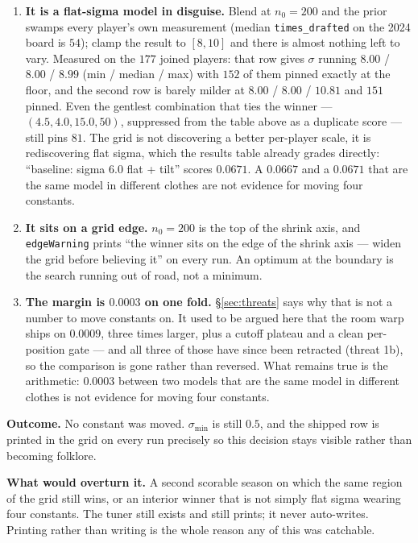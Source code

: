 \documentclass[10pt,a4paper]{article}
\theoremstyle{plain}
\theoremstyle{definition}
\theoremstyle{remark}
\newcommand{\code}[1]{\texttt{\small #1}}
\begin{document}
\begin{enumerate}
\item \textbf{It is a flat-sigma model in disguise.} Blend at $n_0 = 200$ and the prior
swamps every player's own measurement (median \code{times\_drafted} on the 2024 board is
$54$); clamp the result to $[8, 10]$ and there is almost nothing left to vary. Measured on
the $177$ joined players: that row gives $\sigma$ running $8.00$ / $8.00$ / $8.99$ (min /
median / max) with $152$ of them pinned exactly at the floor, and the second row is barely
milder at $8.00$ / $8.00$ / $10.81$ and $151$ pinned. Even the gentlest combination that
ties the winner --- $(4.5, 4.0, 15.0, 50)$, suppressed from the table above as a duplicate
score --- still pins $81$. The grid is not discovering a better per-player scale, it is
rediscovering flat sigma, which the results table already grades directly: ``baseline:
sigma 6.0 flat + tilt'' scores $0.0671$. A $0.0667$ and a $0.0671$ that are the same
model in different clothes are not evidence for moving four constants.

\item \textbf{It sits on a grid edge.} $n_0 = 200$ is the top of the shrink axis, and
\code{edgeWarning} prints ``the winner sits on the edge of the shrink axis --- widen the
grid before believing it'' on every run. An optimum at the boundary is the search running
out of road, not a minimum.

\item \textbf{The margin is $0.0003$ on one fold.} \S\ref{sec:threats} says why that is
not a number to move constants on. It used to be argued here that the room warp ships on
$0.0009$, three times larger, plus a cutoff plateau and a clean per-position gate --- and
all three of those have since been retracted (threat 1b), so the comparison is gone rather
than reversed. What remains true is the arithmetic: $0.0003$ between two models that are
the same model in different clothes is not evidence for moving four constants.
\end{enumerate}

\textbf{Outcome.} No constant was moved. $\sigma_{\min}$ is still $0.5$, and the shipped
row is printed in the grid on every run precisely so this decision stays visible rather
than becoming folklore.

\textbf{What would overturn it.} A second scorable season on which the same region of the
grid still wins, or an interior winner that is not simply flat sigma wearing four
constants. The tuner still exists and still prints; it never auto-writes. Printing rather
than writing is the whole reason any of this was catchable.
\end{document}
